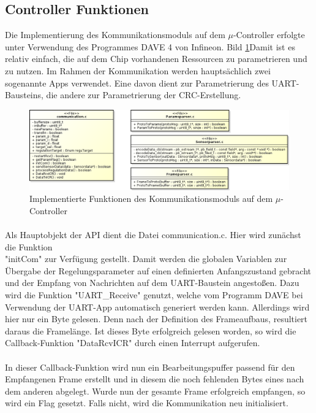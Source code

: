 \subsection{Controller Funktionen}
Die Implementierung des Kommunikationsmoduls auf dem $\mu$-Controller erfolgte unter Verwendung des Programmes DAVE 4 von Infineon. Bild \ref{fig:xmcobj}Damit ist es relativ einfach, die auf dem Chip vorhandenen Ressourcen zu parametrieren und zu nutzen. Im Rahmen der Kommunikation werden hauptsächlich zwei sogenannte Apps verwendet. Eine davon dient zur Parametrierung des UART-Bausteins, die andere zur Parametrierung der CRC-Erstellung.
\begin{figure}
  \includegraphics[width=\textwidth]{XMCObjects}
  \caption{Implementierte Funktionen des Kommunikationsmoduls auf dem $\mu$-Controller}
  \label{fig:xmcobj}
\end{figure}
\paragraph{}
Als Hauptobjekt der API dient die Datei communication.c. Hier wird zunächst die Funktion \\"initCom" zur Verfügung gestellt. Damit werden die globalen Variablen zur Übergabe der Regelungsparameter auf einen definierten Anfangszustand gebracht und der Empfang von Nachrichten auf dem UART-Baustein angestoßen. Dazu wird die Funktion "UART\_Receive" genutzt, welche vom Programm DAVE bei Verwendung der UART-App automatisch generiert werden kann. Allerdings wird hier nur ein Byte gelesen. Denn nach der Definition des Frameaufbaus, resultiert daraus die Framelänge. Ist dieses Byte erfolgreich gelesen worden, so wird die Callback-Funktion "DataRcvICR" durch einen Interrupt aufgerufen.
\paragraph{}
In dieser Callback-Funktion wird nun ein Bearbeitungspuffer passend für den Empfangenen Frame erstellt und in diesem die noch fehlenden Bytes eines nach dem anderen abgelegt. Wurde nun der gesamte Frame erfolgreich empfangen, so wird ein Flag gesetzt. Falls nicht, wird die Kommunikation neu initialisiert.

